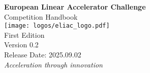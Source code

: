 
\begin{titlepage}
    \centering
    \vspace*{2cm}
    {\Huge\bfseries European Linear Accelerator Challenge\\[0.5cm]}
    {\LARGE Competition Handbook\\[2cm]}
    \texttt{[image: logos/eliac\_logo.pdf]}\\[2cm]
    {\Large First Edition\\[2cm]}
    {\Large Version 0.2\\[0.5cm]}
    {\large Release Date: 2025.09.02\\[2cm]}
    \vfill
    {\large\textit{Acceleration through innovation}}\\[0.5cm]
\end{titlepage}